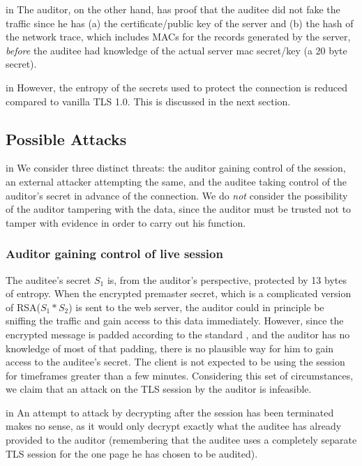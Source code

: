\documentclass[10pt,a4paper]{article}
\begin{document}
 in
\noindent The auditor, on the other hand, has proof that the auditee did not fake the traffic since he has (a) the certificate/public key of the server and (b) the hash of the network trace, which includes MACs for the records generated by the server, \emph{before} the auditee had knowledge of the actual server mac secret/key (a 20 byte secret).

 in
\noindent However, the entropy of the secrets used to protect the connection is reduced compared to vanilla TLS 1.0. This is discussed in the next section.

\subsection{Possible Attacks}
 in
\noindent We consider three distinct threats: the auditor gaining control of the session, an external attacker attempting the same, and the auditee taking control of the auditor's secret in advance of the connection. We do \emph{not} consider the possibility of the auditor tampering with the data, since the auditor must be trusted not to tamper with evidence in order to carry out his function.

\subsubsection{Auditor gaining control of live session}

\noindent The auditee's secret $S_1$ is, from the auditor's perspective, protected by 13 bytes of entropy. When the encrypted premaster secret, which is a complicated version of RSA($S_1*S_2$) is sent to the web server, the auditor could in principle be sniffing the traffic and gain access to this data immediately. However, since the encrypted message is padded according to the standard \cite{RSA_spec}, and the auditor has no knowledge of most of that padding, there is no plausible way for him to gain access to the auditee's secret. The client is not expected to be using the session for timeframes greater than a few minutes. Considering this set of circumstances, we claim that an attack on the TLS session by the auditor is infeasible.

 in
\noindent An attempt to attack by decrypting after the session has been terminated makes no sense, as it would only decrypt exactly what the auditee has already provided to the auditor (remembering that the auditee uses a completely separate TLS session for the one page he has chosen to be audited).
\end{document}
